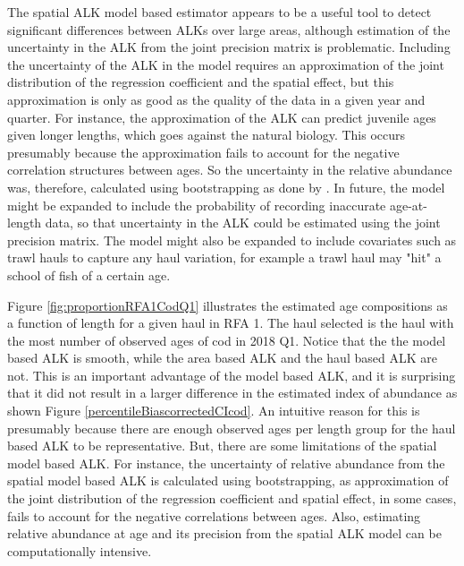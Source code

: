 \documentclass[a4paper 12pt]{article}
\numberwithin{equation}{section}
\begin{document}
The spatial ALK model based estimator appears to be a useful tool to detect significant differences between ALKs over large areas, although estimation of the uncertainty in the ALK from the joint precision matrix is problematic. Including the uncertainty of the ALK in the model requires an approximation of the joint distribution of the regression coefficient and the spatial effect, but this approximation is only as good as the quality of the data in a given year and quarter. For instance, the approximation of the ALK can predict juvenile ages given longer lengths, which goes against the natural biology. This occurs presumably because the approximation fails to account for the negative correlation structures between ages. So the uncertainty in the relative abundance was, therefore, calculated using bootstrapping as done by \citet{berg2012spatial,berg2014evaluation}. In future, the model might be expanded to include the probability of recording inaccurate age-at-length data, so that uncertainty in the ALK could be estimated using the joint precision matrix. The model might also be expanded to include covariates such as trawl hauls to capture any haul variation, for example a trawl haul may "hit" a school of fish  of a certain age.



Figure \ref{fig:proportionRFA1CodQ1} illustrates the estimated age compositions as a function of length for a given haul in RFA 1. The haul selected is the haul with the most number of observed ages of cod in 2018 Q1. Notice that the the model based ALK is smooth, while the area based ALK and the haul based ALK are not. This is an important advantage of the model based ALK, and it is surprising that it did not result in a larger difference in the estimated index of abundance as shown Figure \ref{percentileBiascorrectedCIcod}. An intuitive reason for this is presumably because there are enough observed ages per length group for the haul based ALK to be representative. But, there are some limitations of the spatial model based ALK. For instance, the uncertainty of relative abundance from the spatial model based ALK is calculated using bootstrapping, as approximation of the joint distribution of the regression coefficient and spatial effect, in some cases, fails to account for the  negative correlations between ages. Also, estimating relative abundance at age and its precision from the spatial ALK model can be computationally intensive. 
\end{document}
